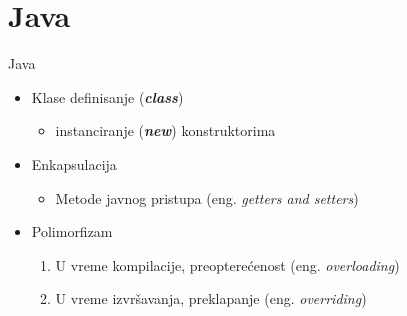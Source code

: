 \documentclass[14pt,aspectratio=169]{beamer}
\begin{document}
\section{Java}
\begin{frame}[fragile]{Java}
\begin{itemize}
\item Klase definisanje ({\em\textbf{class}})
	\begin{itemize}
		\item  instanciranje  ({\em \textbf{new}}) konstruktorima
	\end{itemize}
\item Enkapsulacija
\begin{table}
	\begin{itemize}
		\item  Metode javnog pristupa (eng. {\em getters and setters})
	\end{itemize}
\end{table}
\item Polimorfizam
	\begin{enumerate}
		\item U vreme kompilacije, preopterećenost (eng. {\em overloading})
		\item U vreme izvršavanja, preklapanje (eng. {\em overriding})
	\end{enumerate}	
\end{itemize}	
\end{frame}
\end{document}
